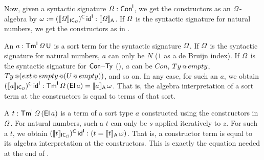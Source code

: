 \documentclass[a4paper,UKenglish,cleveref, autoref]{lipics-v2019}
\begin{document}
\begin{example}\label{ex:constructors}
  Now, given a syntactic signature $\mathit{\Omega}:\mathsf{Con}^{\mathsf{I}}$, we get the
  constructors as an $\mathit{\Omega}$-algebra by
  $\omega:=(\llbracket\mathit{\Omega}\rrbracket_{\mathsf{IC}_{\mathit{\Omega}}})^{\mathsf{C}}\,\mathsf{id}^{\mathsf{I}} :
  \llbracket\mathit{\Omega}\rrbracket_{\mathsf{A}}$. If $\mathit{\Omega}$ is the syntactic signature for natural
  numbers, we get the constructors as in .

  An $a : \mathsf{Tm}^{\mathsf{I}}\,\mathit{\Omega}\,\mathsf{U}$ is a sort term for the syntactic
  signature $\mathit{\Omega}$. If $\mathit{\Omega}$ is the syntactic signature for
  natural numbers, $a$ can only be $N$ ($1$ as a de Bruijn index). If
  $\mathit{\Omega}$ is the syntactic signature for $\mathsf{Con}$--$\mathsf{Ty}$
  (), $a$ can be $Con$, $Ty\mathop{{\scriptstyle @}}{empty}$,
  $Ty\mathop{{\scriptstyle @}}({ext}\mathop{{\scriptstyle @}} {empty}\mathop{{\scriptstyle @}}(U\mathop{{\scriptstyle @}}{empty}))$, and so
  on. In any case, for such an $a$, we obtain
  $(\llbracket a\rrbracket_{\mathsf{IC}_{\mathit{\Omega}}})^{\mathsf{C}}\,\mathsf{id}^{\mathsf{I}} : \mathsf{Tm}^{\mathsf{I}}\,\mathit{\Omega}\,(\mathsf{El}\,a) = \llbracket
  a\rrbracket_{\mathsf{A}}\,\omega$. That is, the algebra interpretation of a sort term
  at the constructors is equal to terms of that sort.

  A $t : \mathsf{Tm}^{\mathsf{I}}\,\mathit{\Omega}\,(\mathsf{El}\,a)$ is a term of a sort type $a$
  constructed using the constructors in $\mathit{\Omega}$. For natural numbers,
  such a $t$ can only be $s$ applied iteratively to $z$. For such a
  $t$, we obtain
  $(\llbracket t\rrbracket_{\mathsf{IC}_{\mathit{\Omega}}})^{\mathsf{C}}\,\mathsf{id}^{\mathsf{I}} : (t = \llbracket
  t\rrbracket_{\mathsf{A}}\,\omega)$. That is, a constructor term is equal to its
  algebra interpretation at the constructors. This is exactly the
  equation needed at the end of .
\end{example}
\end{document}
